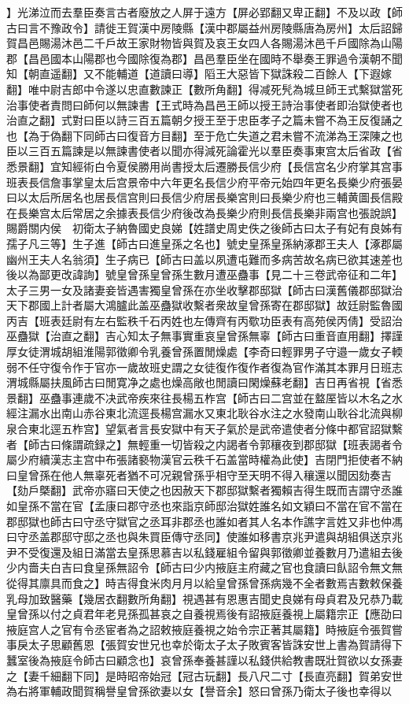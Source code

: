 】光涕泣而去羣臣奏言古者廢放之人屏于遠方【屏必郢翻又卑正翻】不及以政【師古曰言不豫政令】請徙王賀漢中房陵縣【漢中郡屬益州房陵縣唐為房州】太后詔歸賀昌邑賜湯沐邑二千戶故王家財物皆與賀及哀王女四人各賜湯沐邑千戶國除為山陽郡【昌邑國本山陽郡也今國除復為郡】昌邑羣臣坐在國時不舉奏王罪過令漢朝不聞知【朝直遥翻】又不能輔道【道讀曰導】䧟王大惡皆下獄誅殺二百餘人【下遐嫁翻】唯中尉吉郎中令遂以忠直數諫正【數所角翻】得减死髠為城旦師王式繫獄當死治事使者責問曰師何以無諫書【王式時為昌邑王師以授王詩治事使者即治獄使者也治直之翻】式對曰臣以詩三百五篇朝夕授王至于忠臣孝子之篇未嘗不為王反復誦之也【為于偽翻下同師古曰復音方目翻】至于危亡失道之君未嘗不流涕為王深陳之也臣以三百五篇諫是以無諫書使者以聞亦得減死論霍光以羣臣奏事東宫太后省政【省悉景翻】宜知經術白令夏侯勝用尚書授太后遷勝長信少府【長信宫名少府掌其宫事班表長信詹事掌皇太后宫景帝中六年更名長信少府平帝元始四年更名長樂少府張晏曰以太后所居名也居長信宫則曰長信少府居長樂宮則曰長樂少府也三輔黄圖長信殿在長樂宫太后常居之余據表長信少府後改為長樂少府則長信長樂非兩宫也張說誤】賜爵關内侯　初衛太子納魯國史良娣【姓譜史周史佚之後師古曰太子有妃有良姊有孺子凡三等】生子進【師古曰進皇孫之名也】號史皇孫皇孫納涿郡王夫人【涿郡屬幽州王夫人名翁須】生子病已【師古曰盖以夙遭屯難而多病苦故名病已欲其速差也後以為鄙更改諱詢】號皇曾孫皇曾孫生數月遭巫蠱事【見二十三卷武帝征和二年】太子三男一女及諸妻妾皆遇害獨皇曾孫在亦坐收擊郡邸獄【師古曰漢舊儀郡邸獄治天下郡國上計者屬大鴻臚此盖巫蠱獄收繫者衆故皇曾孫寄在郡邸獄】故廷尉監魯國丙吉【班表廷尉有左右監秩千石丙姓也左傳齊有丙歜功臣表有高苑侯丙倩】受詔治巫蠱獄【治直之翻】吉心知太子無事實重哀皇曾孫無辜【師古曰重音直用翻】擇謹厚女徒渭城胡組淮陽郭徵卿令乳養曾孫置閒燥處【李奇曰輕罪男子守邉一歲女子輭弱不任守復令作于官亦一歲故班史謂之女徒復作復作者復為官作滿其本罪月日班志渭城縣屬扶風師古曰閒寛净之處也燥高敞也閒讀曰閑燥蘇老翻】吉日再省視【省悉景翻】巫蠱事連歲不决武帝疾來往長楊五柞宫【師古曰二宫並在盩厔皆以木名之水經注漏水出南山赤谷東北流逕長楊宫漏水又東北耿谷水注之水發南山耿谷北流與柳泉合東北逕五柞宫】望氣者言長安獄中有天子氣於是武帝遣使者分條中都官詔獄繫者【師古曰條謂疏録之】無輕重一切皆殺之内謁者令郭穰夜到郡邸獄【班表謁者令屬少府續漢志主宫中布張諸褻物漢官云秩千石盖當時權為此使】吉閉門拒使者不納曰皇曾孫在他人無辜死者猶不可况親曾孫乎相守至天明不得入穰還以聞因劾奏吉【劾戶槩翻】武帝亦寤曰天使之也因赦天下郡邸獄繫者獨賴吉得生既而吉謂守丞誰如皇孫不當在官【孟康曰郡守丞也來詣京師邸治獄姓誰名如文穎曰不當在官不當在郡邸獄也師古曰守丞守獄官之丞耳非郡丞也誰如者其人名本作譙字言姓又非也仲馮曰守丞盖郡邸守邸之丞也與朱買臣傳守丞同】使誰如移書京兆尹遣與胡組俱送京兆尹不受復還及組日滿當去皇孫思慕吉以私錢雇組令留與郭徵卿並養數月乃遣組去後少内嗇夫白吉曰食皇孫無詔令【師古曰少内掖庭主府藏之官也食讀曰飤詔令無文無從得其廪具而食之】時吉得食米肉月月以給皇曾孫曾孫病幾不全者數焉吉數敕保養乳母加致醫藥【幾居衣翻數所角翻】視遇甚有恩惠吉聞史良娣有母貞君及兄恭乃載皇曾孫以付之貞君年老見孫孤甚哀之自養視焉後有詔掖庭養視上屬籍宗正【應劭曰掖庭宫人之官有令丞宦者為之詔敕掖庭養視之始令宗正著其屬籍】時掖庭令張賀嘗事戾太子思顧舊恩【張賀安世兄也幸於衛太子太子敗賓客皆誅安世上書為賀請得下蠶室後為掖庭令師古曰顧念也】哀曾孫奉養甚謹以私錢供給教書既壯賀欲以女孫妻之【妻千細翻下同】是時昭帝始冠【冠古玩翻】長八尺二寸【長直亮翻】賀弟安世為右將軍輔政聞賀稱譽皇曾孫欲妻以女【譽音余】怒曰曾孫乃衛太子後也幸得以